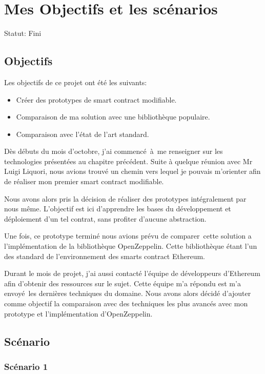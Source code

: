 \section{Mes Objectifs et les scénarios}

Statut: Fini

\subsection{Objectifs}

Les objectifs de ce projet ont été les suivants:

\begin{itemize}
    \item Créer des prototypes de smart contract modifiable.
    \item Comparaison de ma solution avec une bibliothèque populaire.
    \item Comparaison avec l'état de l'art standard.
\end{itemize}

Dès débuts du mois d'octobre, j'ai commencé à me renseigner sur les technologies présentées au chapitre
précédent. Suite à quelque réunion avec Mr Luigi Liquori, nous avions trouvé un chemin vers
lequel je pouvais m'orienter afin de réaliser mon premier smart contract modifiable.

Nous avons alors pris la décision de réaliser des prototypes intégralement par nous même.
L'objectif est ici d'apprendre les bases du développement et déploiement d'un tel contrat,
sans profiter d'aucune abstraction.

Une fois, ce prototype terminé nous avions prévu de comparer cette solution a l'implémentation
de la bibliothèque OpenZeppelin. Cette bibliothèque étant l'un des standard de l'environnement
des smarts contract Ethereum.

Durant le mois de projet, j'ai aussi contacté l'équipe de développeurs d'Ethereum afin d'obtenir
des ressources sur le sujet. Cette équipe m'a répondu est m'a envoyé les dernières techniques du
domaine. Nous avons alors décidé d'ajouter comme objectif la comparaison avec des techniques les
plus avancés avec mon prototype et l'implémentation d'OpenZeppelin.

\subsection{Scénario}

\subsubsection{Scénario 1}

